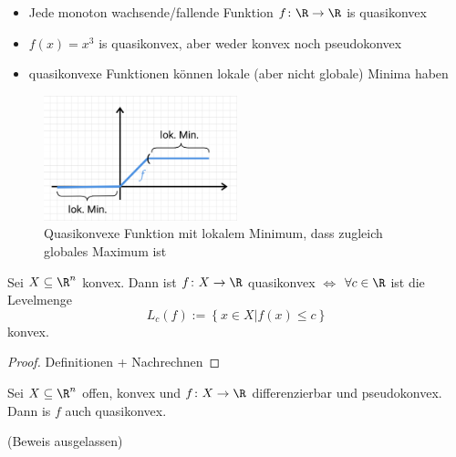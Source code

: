 \begin{beispiel}\enter
\label{thm:quasikonvexbsp}
\begin{itemize}
	\item Jede monoton wachsende/fallende Funktion $f \colon \R \rightarrow \R $ is quasikonvex
	\item $f(x) = x^{3}$ is quasikonvex, aber weder konvex noch pseudokonvex
	\item quasikonvexe Funktionen können lokale (aber nicht globale) Minima haben
\end{itemize}
\begin{figure}[ht!]
\begin{center}
	\includegraphics[width=0.5\textwidth]{pics/texplot3.png}
\end{center}
\caption{Quasikonvexe Funktion mit lokalem Minimum, dass zugleich globales Maximum ist}
\label{fig:quasikonvexeFunktion}
\end{figure}

\end{beispiel}

\begin{lemma}
\label{thm:quasikonvexlemma}
	Sei $X \subseteq \R^{n}$ konvex. Dann ist $f \colon X \rightarrow \R $ quasikonvex $\iff$
	$\forall c \in \R$ ist die Levelmenge 
	\[
	L_{c}(f) := \left\{ x \in X | f(x) \leq c \right\} 
	\] konvex.
\end{lemma}

\begin{proof}
\label{thm:quasikonvexlemmabeweis}
	Definitionen + Nachrechnen
\end{proof}

\begin{satz}
\label{thm:pseudoundquasikonvexität}
	Sei $X \subseteq \R^{n}$ offen, konvex und $f \colon X \rightarrow \R $ differenzierbar und pseudokonvex. Dann is $f$ auch quasikonvex.
	
	(Beweis ausgelassen)
\end{satz}

